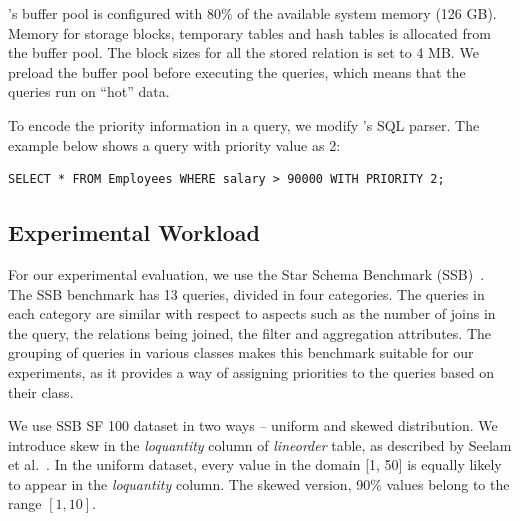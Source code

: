 \sys{}'s buffer pool is configured with 80\% of the available system memory (126 GB). 
Memory for storage blocks, temporary tables and hash tables is allocated from the buffer 
pool.
The block sizes for all the stored relation is set to 4 MB.
We preload the buffer pool before executing the queries, which means that the queries run 
on ``hot'' data. 

To encode the priority information in a query, we modify \sys{}'s SQL parser.
The example below shows a query with priority value as 2:
\begin{lstlisting}
SELECT * FROM Employees WHERE salary > 90000 WITH PRIORITY 2;
\end{lstlisting}
\vspace{-1em}

\subsection{Experimental Workload}\label{ssec:workload}
For our experimental evaluation, we use the Star Schema Benchmark (SSB)~\cite{ssb}. 
The SSB benchmark has 13 queries, divided in four categories. 
The queries in each category are similar with respect to aspects such as the 
number of joins in the query, the relations being joined, the filter and aggregation 
attributes. 
The grouping of queries in various classes makes this benchmark suitable for our 
experiments, as it provides a way of assigning priorities to the queries based on their class. 

We use SSB SF 100 dataset in two ways -- uniform and skewed distribution. 
We introduce skew in the \textit{lo\textunderscore quantity} column of \textit{lineorder} table, as described by Seelam et al.~\cite{DBLP:conf/wosp/2013}.
In the uniform dataset, every value in the domain [1, 50] is equally likely to appear in the \textit{lo\textunderscore quantity} column.
The skewed version, 90\% values belong to the range $[1, 10]$. 

